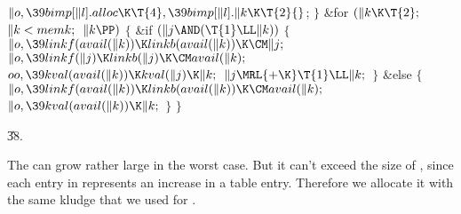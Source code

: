 ${}\|o,\39\\{bimp}[\|l].\\{alloc}\K\T{4},\39\\{bimp}[\|l].\|k\K\T{2}{}$;\6
\4${}\}{}$\2\6
\&{for} ${}(\|k\K\T{2};{}$ ${}\|k<\\{memk};{}$ ${}\|k\PP){}$\5
${}\{{}$\1\6
\&{if} ${}(\|j\AND(\T{1}\LL\|k)){}$\5
${}\{{}$\1\6
${}\|o,\39\\{linkf}(\\{avail}(\|k))\K\\{linkb}(\\{avail}(\|k))\K\CM\|j;{}$\6
${}\|o,\39\\{linkf}(\|j)\K\\{linkb}(\|j)\K\CM\\{avail}(\|k);{}$\6
${}\\{oo},\39\\{kval}(\\{avail}(\|k))\K\\{kval}(\|j)\K\|k;{}$\6
${}\|j\MRL{+{\K}}\T{1}\LL\|k;{}$\6
\4${}\}{}$\2\6
\&{else}\5
${}\{{}$\1\6
${}\|o,\39\\{linkf}(\\{avail}(\|k))\K\\{linkb}(\\{avail}(\|k))\K\CM\\{avail}(%
\|k);{}$\6
${}\|o,\39\\{kval}(\\{avail}(\|k))\K\|k;{}$\6
\4${}\}{}$\2\6
\4${}\}{}$\2\par
\U38.\fi

The  can grow rather large in the worst case. But
it can't exceed the size of , since each entry in 
represents
an increase in a  table entry.
Therefore we allocate it with the same kludge that we used for .

